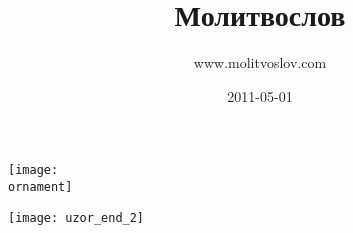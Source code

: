 \documentclass[12pt,oneside]{book}
\title{\Huge\bfseries Молитвослов}
\author{www.molitvoslov.com}
\date{2011-05-01}
\newcommand{\ornament}{uzor_begin_2}
\begin{document}
\maketitle
{\setlength\parindent{0pt}
\texttt{[image: \\ornament]}}
\tableofcontents
\nopagebreak\bigskip\bigskip
\begin{center}
\texttt{[image: uzor\_end\_2]}
\end{center}



\renewcommand{\ornament}{uzor_begin_3}

\end{document}
